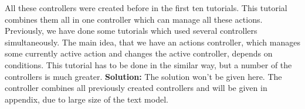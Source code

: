 All these controllers were created before in the first ten tutorials. This tutorial combines them all in one controller which can manage all these actions. Previously, we have done some tutorials which used several controllers simultaneously. The main idea, that we have an actions controller, which manages some currently active action and changes the active controller, depends on conditions. This tutorial has to be done in the similar way, but a number of the controllers is much greater. \newline \newline
\textbf{Solution:} \newline \newline
The solution won't be given here. The controller combines all previously created controllers and will be given in appendix, due to large size of the text model.

